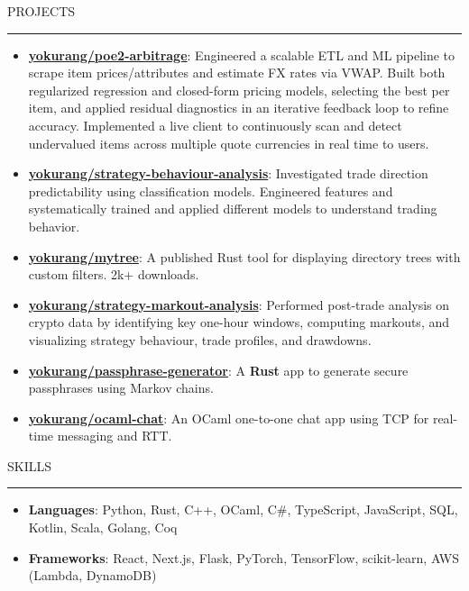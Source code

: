 \documentclass[letterpaper, 11pt]{article}
\def\sectionlineskip{\medskip}
\def\sectionskip{\medskip}
\def \entryspacing {-0pt}
\newcommand{\SectionHeading}[1]{
  \sectionskip
  \raggedright\raggedbottom\MakeUppercase{\large{#1}}
  \sectionlineskip
  \hrule
  \color{black}
}
\newcommand{\ResumeItem}[2]{
  \item{
    \textbf{#1}{: #2 \vspace{-2.835pt}}
  }
}
\newcommand{\ResumeProjectItem}[3]{
  \item{
    \href{#2}{\textbf{#1}}{: #3 \vspace{-2.835pt}}
  }
}
\newcommand{\ResumeEntryStart}{\begin{itemize}[leftmargin=0mm, label={}]}
\newcommand{\ResumeEntryEnd}{\end{itemize}\vspace{-2.835pt}} %
\newcommand{\ProjectItemListStart}{\begin{itemize}[leftmargin=*, label=$\bullet$]}
\newcommand{\ProjectItemListEnd}{\end{itemize}\vspace{\entryspacing}}
\begin{document}
  \SectionHeading{Projects}
  \ProjectItemListStart
  \ResumeProjectItem{yokurang/poe2-arbitrage}
  {https://github.com/yokurang/path-of-elixe}
  {Engineered a scalable ETL and ML pipeline to scrape item prices/attributes and estimate FX rates via VWAP. Built both regularized regression and closed-form pricing models, selecting the best per item, and applied residual diagnostics in an iterative feedback loop to refine accuracy. Implemented a live client to continuously scan and detect undervalued items across multiple quote currencies in real time to users.}

  \ResumeProjectItem{yokurang/strategy-behaviour-analysis}
  {https://github.com/yokurang/trading-strategy-behavior-analysis}
  {Investigated trade direction predictability using classification models. Engineered features and systematically trained and applied different models to understand trading behavior.}

  \ResumeProjectItem{yokurang/mytree}
  {https://github.com/yokurang/mytree}
  {A published Rust tool for displaying directory trees with custom filters. 2k+ downloads.}

  \ResumeProjectItem{yokurang/strategy-markout-analysis}
  {https://github.com/yokurang/trading-strategy-markout-analysis}
  {Performed post-trade analysis on crypto data by identifying key one-hour windows, computing markouts, and visualizing strategy behaviour, trade profiles, and drawdowns.}

  \ResumeProjectItem{yokurang/passphrase-generator}
  {https://github.com/yokurang/passphrase-generator}
  {A \textbf{Rust} app to generate secure passphrases using Markov chains.}
  \ResumeProjectItem{yokurang/ocaml-chat}
  {https://github.com/yokurang/ocaml-chat}
  {An OCaml one-to-one chat app using TCP for real-time messaging and RTT.}
  \ProjectItemListEnd

  \SectionHeading{Skills}
  \ResumeEntryStart
    \ResumeItem{Languages}{ Python, Rust, C++, OCaml, C\#, TypeScript, JavaScript, SQL, Kotlin, Scala, Golang, Coq }
    \ResumeItem{Frameworks}{ React, Next.js, Flask, PyTorch, TensorFlow, scikit-learn, AWS (Lambda, DynamoDB) }
  \ResumeEntryEnd
\end{document}
